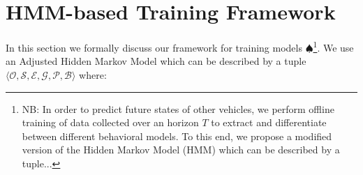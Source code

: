 \documentclass[letterpaper, 10 pt, conference]{ieeeconf}  %
\newcommand\NB[1]{$\spadesuit$\footnote{NB: #1}}
\begin{document}

\section{HMM-based Training Framework} \label{sec:fmwk}
In this section we formally discuss our framework for training models \NB{In order to predict future states of other vehicles, we perform offline training of data collected over an horizon $T$ to extract and differentiate between different behavioral models. To this end, we propose a modified version of the Hidden Markov Model (HMM) \cite{} which can be described by a tuple... }. We use an Adjusted Hidden Markov Model which can be described by a tuple $\langle \mathcal{O},\mathcal{S},\mathcal{E},\mathcal{G},\mathcal{P},\mathcal{B} \rangle$  where:
\end{document}
